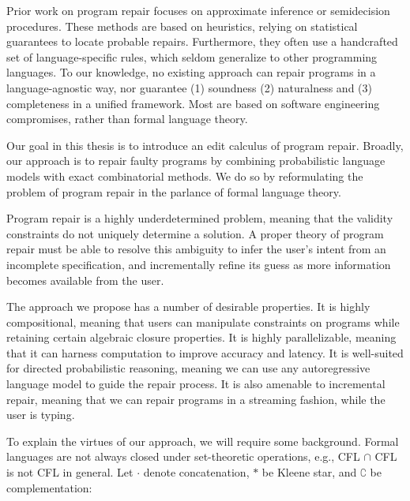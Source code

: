 Prior work on program repair focuses on approximate inference or semidecision procedures. These methods are based on heuristics, relying on statistical guarantees to locate probable repairs. Furthermore, they often use a handcrafted set of language-specific rules, which seldom generalize to other programming languages. To our knowledge, no existing approach can repair programs in a language-agnostic way, nor guarantee (1) soundness (2) naturalness and (3) completeness in a unified framework. Most are based on software engineering compromises, rather than formal language theory.

Our goal in this thesis is to introduce an edit calculus of program repair. Broadly, our approach is to repair faulty programs by combining probabilistic language models with exact combinatorial methods. We do so by reformulating the problem of program repair in the parlance of formal language theory. %

Program repair is a highly underdetermined problem, meaning that the validity constraints do not uniquely determine a solution. A proper theory of program repair must be able to resolve this ambiguity to infer the user's intent from an incomplete specification, and incrementally refine its guess as more information becomes available from the user.

The approach we propose has a number of desirable properties. It is highly compositional, meaning that users can manipulate constraints on programs while retaining certain algebraic closure properties. It is highly parallelizable, meaning that it can harness computation to improve accuracy and latency. It is well-suited for directed probabilistic reasoning, meaning we can use any autoregressive language model to guide the repair process. It is also amenable to incremental repair, meaning that we can repair programs in a streaming fashion, while the user is typing.

To explain the virtues of our approach, we will require some background. Formal languages are not always closed under set-theoretic operations, e.g., CFL $\cap$ CFL is not CFL in general. Let $\cdot$ denote concatenation, $*$ be Kleene star, and $\complement$ be complementation:\\

